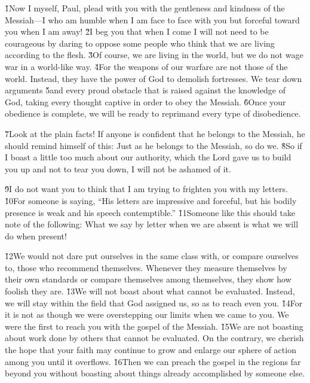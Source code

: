 \v{1}Now I myself, Paul, plead with you with the gentleness and kindness of the Messiah---I who am humble when I am face to face with you but forceful toward you when I am away! \v{2}I beg you that when I come I will not need to be courageous by daring to oppose some people who think that we are living according to the flesh. \v{3}Of course, we are living in the world, but we do not wage war in a world-like way. \v{4}For the weapons of our warfare are not those of the world. Instead, they have the power of God to demolish fortresses. We tear down arguments \v{5}and every proud obstacle that is raised against the knowledge of God, taking every thought captive in order to obey the Messiah. \v{6}Once your obedience is complete, we will be ready to reprimand every type of disobedience.

\v{7}Look at the plain facts! If anyone is confident that he belongs to the Messiah, he should remind himself of this: Just as he belongs to the Messiah, so do we. \v{8}So if I boast a little too much about our authority, which the Lord gave us to build you up and not to tear you down, I will not be ashamed of it.

\v{9}I do not want you to think that I am trying to frighten you with my letters. \v{10}For someone is saying, ``His letters are impressive and forceful, but his bodily presence is weak and his speech contemptible.'' \v{11}Someone like this should take note of the following: What we say by letter when we are absent is what we will do when present!

\v{12}We would not dare put ourselves in the same class with, or compare ourselves to, those who recommend themselves. Whenever they measure themselves by their own standards or compare themselves among themselves, they show how foolish they are. \v{13}We will not boast about what cannot be evaluated. Instead, we will stay within the field that God assigned us, so as to reach even you. \v{14}For it is not as though we were overstepping our limits when we came to you. We were the first to reach you with the gospel of the Messiah. \v{15}We are not boasting about work done by others that cannot be evaluated. On the contrary, we cherish the hope that your faith may continue to grow and enlarge our sphere of action among you until it overflows. \v{16}Then we can preach the gospel in the regions far beyond you without boasting about things already accomplished by someone else.

